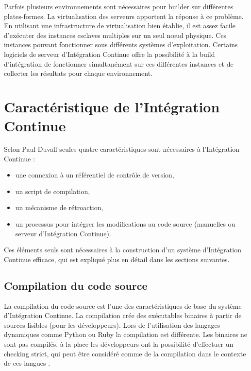     Parfois plusieurs environnements sont nécessaires pour builder sur différentes plates-formes. La virtualisation des serveurs apportent la réponse à ce problème. En utilisant une infrastructure de virtualisation bien établie, il est assez facile d’exécuter des instances esclaves multiples sur un seul nœud physique. Ces instances pouvant fonctionner sous différents systèmes d’exploitation. Certains logiciels de serveur d’Intégration Continue offre la possibilité à la build d’intégration de fonctionner simultanément sur ces différentes instances et de collecter les résultats pour chaque environnement.\\

  \section{Caractéristique de l’Intégration Continue}
  Selon Paul Duvall \cite{Duv07} seules quatre caractéristiques sont nécessaires à l’Intégration Continue :\\
  \begin{itemize}
    \item une connexion à un référentiel de contrôle de version,
    \item un script de compilation,
    \item un mécanisme de rétroaction,
    \item un processus pour intégrer les modifications au code source (manuelles ou serveur d’Intégration Continue).\\
  \end{itemize}

  Ces éléments seuls sont nécessaires à la construction d’un système d’Intégration Continue efficace, qui est expliqué plus en détail dans les sections suivantes.

    \subsection{Compilation du code source}
    La compilation du code source est l'une des caractéristiques de base du système d’Intégration Continue. La compilation crée des exécutables binaires à partir de sources lisibles (pour les développeurs). Lors de l'utilisation des langages dynamiques comme Python ou Ruby la compilation est différente. Les binaires ne sont pas compilés, à la place les développeurs ont la possibilité d'effectuer un checking strict, qui peut être considéré comme de la compilation dans le contexte de ces langues \cite{Duv07}.

